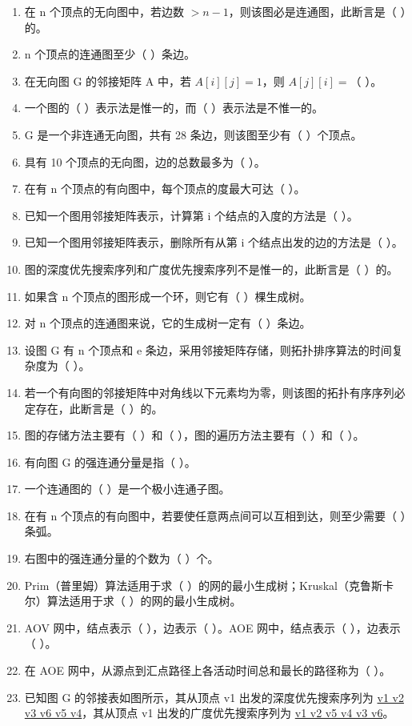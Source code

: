 \documentclass[12pt, a4paper]{article}
\begin{document}
\begin{enumerate}
	\item 在 n 个顶点的无向图中，若边数 $>n-1$，则该图必是连通图，此断言是（ ）的。
	\item n 个顶点的连通图至少（ ）条边。
	\item 在无向图 G 的邻接矩阵 A 中，若 $A[i][j]=1$，则 $A[j][i]=$（ ）。
	\item 一个图的（ ）表示法是惟一的，而（ ）表示法是不惟一的。
	\item G 是一个非连通无向图，共有 28 条边，则该图至少有（ ）个顶点。
	\item 具有 10 个顶点的无向图，边的总数最多为（ ）。
	\item 在有 n 个顶点的有向图中，每个顶点的度最大可达（ ）。
	\item 已知一个图用邻接矩阵表示，计算第 i 个结点的入度的方法是（ ）。
	\item 已知一个图用邻接矩阵表示，删除所有从第 i 个结点出发的边的方法是（ ）。
	\item 图的深度优先搜索序列和广度优先搜索序列不是惟一的，此断言是（ ）的。
	\item 如果含 n 个顶点的图形成一个环，则它有（ ）棵生成树。
	\item 对 n 个顶点的连通图来说，它的生成树一定有（ ）条边。
	\item 设图 G 有 n 个顶点和 e 条边，采用邻接矩阵存储，则拓扑排序算法的时间复杂度为（ ）。
	\item 若一个有向图的邻接矩阵中对角线以下元素均为零，则该图的拓扑有序序列必定存在，此断言是（ ）的。
	\item 图的存储方法主要有（ ）和（ ），图的遍历方法主要有（ ）和（ ）。
	\item 有向图 G 的强连通分量是指（ ）。
	\item 一个连通图的（ ）是一个极小连通子图。
	\item 在有 n 个顶点的有向图中，若要使任意两点间可以互相到达，则至少需要（ ）条弧。
	\item 右图中的强连通分量的个数为（ ）个。
	\item Prim（普里姆）算法适用于求（ ）的网的最小生成树；Kruskal（克鲁斯卡尔）算法适用于求（ ）的网的最小生成树。
	\item AOV 网中，结点表示（ ），边表示（ ）。AOE 网中，结点表示（ ），边表示（ ）。
	\item 在 AOE 网中，从源点到汇点路径上各活动时间总和最长的路径称为（ ）。
	\item 已知图 G 的邻接表如图所示，其从顶点 v1 出发的深度优先搜索序列为 \underline{v1 v2 v3 v6 v5 v4}，其从顶点 v1 出发的广度优先搜索序列为 \underline{v1 v2 v5 v4 v3 v6}。

\end{enumerate}
\end{document}
